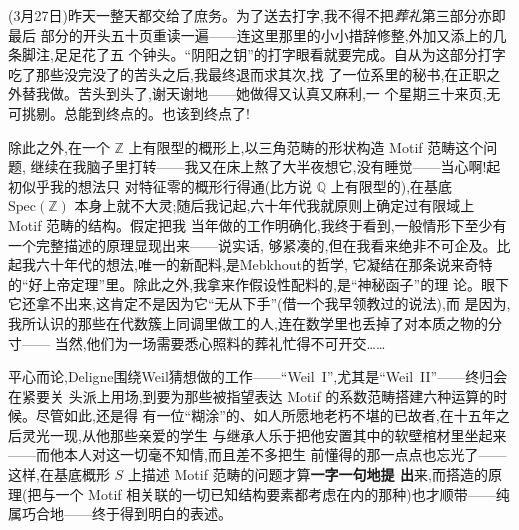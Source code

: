 
(3月27日)昨天一整天都交给了庶务。为了送去打字,我不得不把\emph{葬礼}第三部分亦即最后
部分的开头五十页重读一遍——连这里那里的小小措辞修整,外加又添上的几条脚注,足足花了五
个钟头。“阴阳之钥”的打字眼看就要完成。自从为这部分打字吃了那些没完没了的苦头之后,我最终退而求其次\dmark{},找
了一位系里的秘书,在正职之外替我做。苦头到头了,谢天谢地——她做得又认真又麻利,一
个星期三十来页,无可挑剔。总能到终点的。也该到终点了!

除此之外,在一个 $\mathbb{Z}$ 上有限型的概形上,以三角范畴的形状构造 Motif 范畴这个问题,
继续在我脑子里打转——我又在床上熬了大半夜想它,没有睡觉——当心啊!起初似乎我的想法只
对特征零的概形行得通(比方说 $\mathbb{Q}$ 上有限型的),在基底 $\mathrm{Spec}(\mathbb{Z})$
本身上就不大灵;随后我记起,六十年代我就原则上确定过有限域上 Motif 范畴的结构。假定把我
当年做的工作明确化,我终于看到,一般情形下至少有一个完整描述的原理显现出来——说实话,
够紧凑的,但在我看来绝非不可企及。比起我六十年代的想法,唯一的新配料,是Mebkhout的哲学,
它凝结在那条说来奇特的“好上帝定理”里。除此之外,我拿来作假设性配料的,是“神秘函子”的理
论。眼下它还拿不出来,这肯定不是因为它“无从下手”(借一个我早领教过的说法),而
是因为,我所认识的那些在代数簇上同调里做工的人,连在数学里也丢掉了对本质之物的分寸——
当然,他们为一场需要悉心照料的葬礼忙得不可开交……

平心而论,Deligne围绕Weil猜想做的工作——“Weil~I”,尤其是“Weil~II”——终归会在紧要关
头派上用场,到要为那些被指望表达 Motif 的系数范畴搭建六种运算的时候。尽管如此,还是得
有一位“糊涂”的、如人所愿地老朽不堪的已故者,在十五年之后灵光一现,从他那些亲爱的学生
与继承人乐于把他安置其中的软壁棺材里坐起来——而他本人对这一切毫不知情,而且差不多把生
前懂得的那一点点也忘光了——这样,在基底概形 $S$ 上描述 Motif 范畴的问题才算\textbf{一字一句地提
出}来,而搭造的原理(把与一个 Motif 相关联的一切已知结构要素都考虑在内的那种)也才顺带\dmark{}——纯属巧合地——终于得到明白的表述。

